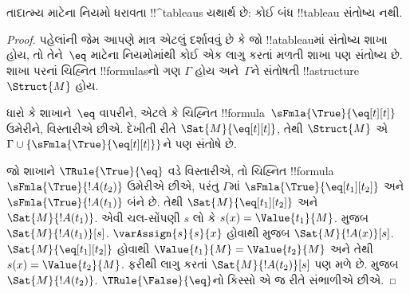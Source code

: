 \documentclass[../../../include/open-logic-section]{subfiles}
\begin{document}


\begin{prop}
તાદાત્મ્ય માટેના નિયમો ધરાવતા !!^{tableau}s યથાર્થ છે: કોઈ બંધ
!!{tableau} સંતોષ્ય નથી.
\end{prop}

\begin{proof}
પહેલાંની જેમ આપણે માત્ર એટલું દર્શાવવું છે કે જો !!a{tableau}માં
સંતોષ્ય શાખા હોય, તો તેને~$\eq$ માટેના નિયમોમાંથી કોઈ એક લાગુ કરતાં
મળતી શાખા પણ સંતોષ્ય છે. શાખા પરનાં ચિહ્નિત !!{formula}sનો ગણ
$\Gamma$ હોય અને~$\Gamma$ને સંતોષતી !!a{structure} $\Struct{M}$ હોય.

ધારો કે શાખાને~$\eq$ વાપરીને, એટલે કે ચિહ્નિત
!!{formula}~$\sFmla{\True}{\eq[t][t]}$ ઉમેરીને, વિસ્તારીએ છીએ. દેખીતી
રીતે $\Sat{M}{\eq[t][t]}$, તેથી $\Struct{M}$ એ
$\Gamma \cup \{\sFmla{\True}{\eq[t][t]}\}$ને પણ સંતોષે છે.

જો શાખાને $\TRule{\True}{\eq}$ વડે વિસ્તારીએ, તો ચિહ્નિત
!!{formula}~$\sFmla{\True}{!A(t_2)}$ ઉમેરીએ છીએ, પરંતુ $\Gamma$માં
$\sFmla{\True}{\eq[t_1][t_2]}$ અને $\sFmla{\True}{!A(t_1)}$ બંને છે.
તેથી $\Sat{M}{\eq[t_1][t_2]}$ અને $\Sat{M}{!A(t_1)}$. એવી ચલ-સોંપણી
$s$ લો કે $s(x) = \Value{t_1}{M}$.
 મુજબ
$\Sat{M}{!A(t_1)}[s]$. $\varAssign{s}{s}{x}$ હોવાથી
 મુજબ $\Sat{M}{!A(x)}[s]$.
$\Sat{M}{\eq[t_1][t_2]}$ હોવાથી
$\Value{t_1}{M} = \Value{t_2}{M}$ અને તેથી
$s(x) = \Value{t_2}{M}$. ફરીથી
 લાગુ કરતાં
$\Sat{M}{!A(t_2)}[s]$ પણ મળે છે.
 મુજબ $\Sat{M}{!A(t_2)}$.
$\TRule{\False}{\eq}$નો કિસ્સો એ જ રીતે સંભાળીએ છીએ.
\end{proof}
\end{document}
